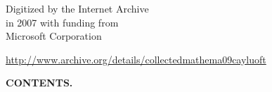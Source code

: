 \documentclass[11pt,a4paper]{book}
\begin{document}
\newpage
\thispagestyle{empty}

\begin{center}
{\small Digitized by the Internet Archive\\
in 2007 with funding from\\
Microsoft Corporation}

\vspace{12pt}
\url{http://www.archive.org/details/collectedmathema09cayluoft}
\end{center}


\newpage
\setcounter{page}{7}

\begin{center}
{\large \textbf{CONTENTS.}}
\end{center}

\vspace{12pt}
\end{document}
